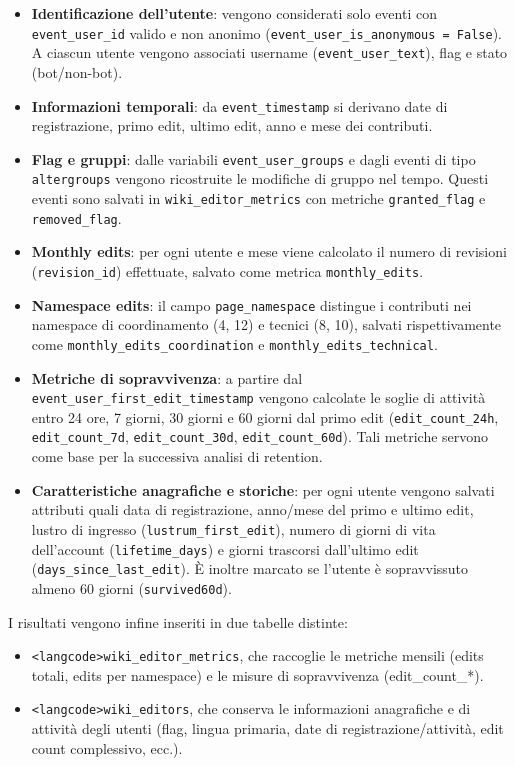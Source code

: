 \begin{itemize}
  \item \textbf{Identificazione dell’utente}: vengono considerati solo eventi con \texttt{event\_user\_id} valido e non anonimo (\texttt{event\_user\_is\_anonymous = False}). A ciascun utente vengono associati username (\texttt{event\_user\_text}), flag e stato (bot/non-bot).
  \item \textbf{Informazioni temporali}: da \texttt{event\_timestamp} si derivano date di registrazione, primo edit, ultimo edit, anno e mese dei contributi.
  \item \textbf{Flag e gruppi}: dalle variabili \texttt{event\_user\_groups} e dagli eventi di tipo \texttt{altergroups} vengono ricostruite le modifiche di gruppo nel tempo. Questi eventi sono salvati in \texttt{wiki\_editor\_metrics} con metriche \texttt{granted\_flag} e \texttt{removed\_flag}.
  \item \textbf{Monthly edits}: per ogni utente e mese viene calcolato il numero di revisioni (\texttt{revision\_id}) effettuate, salvato come metrica \texttt{monthly\_edits}.
  \item \textbf{Namespace edits}: il campo \texttt{page\_namespace} distingue i contributi nei namespace di coordinamento (4, 12) e tecnici (8, 10), salvati rispettivamente come \texttt{monthly\_edits\_coordination} e \texttt{monthly\_edits\_technical}.
  \item \textbf{Metriche di sopravvivenza}: a partire dal \texttt{event\_user\_first\_edit\_timestamp} vengono calcolate le soglie di attività entro 24 ore, 7 giorni, 30 giorni e 60 giorni dal primo edit (\texttt{edit\_count\_24h}, \texttt{edit\_count\_7d}, \texttt{edit\_count\_30d}, \texttt{edit\_count\_60d}). Tali metriche servono come base per la successiva analisi di retention.
  \item \textbf{Caratteristiche anagrafiche e storiche}: per ogni utente vengono salvati attributi quali data di registrazione, anno/mese del primo e ultimo edit, lustro di ingresso (\texttt{lustrum\_first\_edit}), numero di giorni di vita dell’account (\texttt{lifetime\_days}) e giorni trascorsi dall’ultimo edit (\texttt{days\_since\allowbreak\_last\_edit}). È inoltre marcato se l’utente è sopravvissuto almeno 60 giorni (\texttt{survived60d}).
\end{itemize}

I risultati vengono infine inseriti in due tabelle distinte:
\begin{itemize}
  \item \texttt{<langcode>wiki\_editor\_metrics}, che raccoglie le metriche mensili (edits totali, edits per namespace) e le misure di sopravvivenza (edit\_count\_*). 
  \item \texttt{<langcode>wiki\_editors}, che conserva le informazioni anagrafiche e di attività degli utenti (flag, lingua primaria, date di registrazione/attività, edit count complessivo, ecc.).
\end{itemize}

